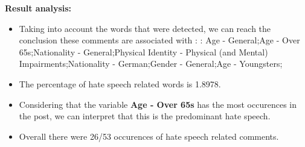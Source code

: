\documentclass[11pt]{article}
\begin{document}
\textbf{\Large Result analysis:}

\begin{itemize}\item Taking into account the words that were detected, we can reach the conclusion these comments are associated with : : Age - General;Age - Over 65s;Nationality - General;Physical Identity - Physical (and Mental) Impairments;Nationality - German;Gender - General;Age - Youngsters;%

\item The percentage of hate speech related words is 1.8978.

\item Considering that the variable \textbf{Age - Over 65s} has the most occurences in the post, we can interpret that this is the predominant hate speech.

\item Overall there were 26/53 occurences of hate speech related comments.\end{itemize}
\end{document}

